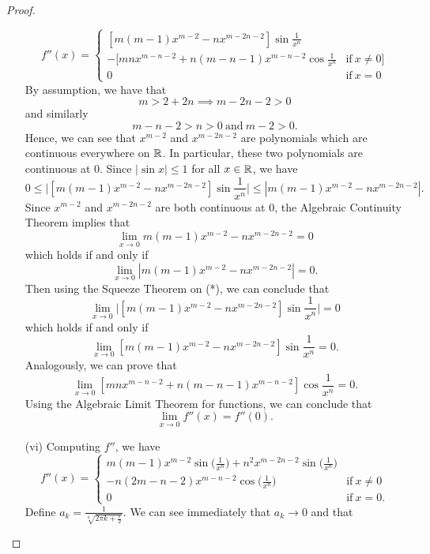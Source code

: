 \documentclass[a4paper]{article}
\begin{document}
\begin{proof}
\begin{enumerate}
        \[  f''(x) = 
        \begin{cases}
            [m(m-1)x^{m-2} - n x^{m-2n-2}] \sin \frac{ 1 }{ x^{n} } \\
            -[mn x^{m-n-2} + n (m - n -1) x^{m-n-2} \cos \frac{ 1 }{ x^{n} } &\text{if} \ x \neq 0 ] \\
            0 &\text{if} \ x = 0 
        \end{cases} \]
        By assumption, we have that 
        \[  m > 2 + 2n \implies m - 2n - 2 > 0 \]
        and similarly
        \[  m - n - 2 > n > 0 \ \text{and} \ m - 2 > 0.  \]
        Hence, we can see that \( x^{m-2} \) and \( x^{m-2n-2}  \) are polynomials which are continuous everywhere on \( \mathbb{R}  \). In particular, these two polynomials are continuous at \( 0  \). Since \( | \sin x  | \leq 1  \) for all \( x \in \mathbb{R}  \), we have
        \[  0 \leq \Big| [m(m-1) x^{m-2} - n x^{m-2n-2}] \sin \frac{ 1 }{ x^{n} }  \Big| \leq | m(m-1) x^{m-2} - n x^{m-2n-2} |. \tag{*}    \]
        Since \( x^{m-2} \) and \( x^{m-2n-2}  \) are both continuous at \( 0  \), the Algebraic Continuity Theorem implies that 
        \[  \lim_{ x \to 0 }  m(m-1) x^{m-2} - n x^{m-2n-2} = 0  \]
        which holds if and only if 
        \[ \lim_{ x \to 0 } | m(m-1) x^{m-2} - n x^{m-2n-2} | = 0.    \]
        Then using the Squeeze Theorem on (*), we can conclude that 
        \[  \lim_{ x \to 0 } \Big| [m(m-1)x^{m-2} - n x^{m-2n-2}] \sin \frac{ 1 }{ x^{n} }  \Big| = 0   \]
        which holds if and only if
        \[ \lim_{ x \to 0 } [m(m-1) x^{m-2} - n x^{m-2n-2}] \sin \frac{ 1 }{ x^{n} } = 0. \tag{1}  \]
        Analogously, we can prove that  
        \[  \lim_{ x \to 0 }  [mn x^{m-n-2} + n (m-n-1) x^{m-n-2}] \cos \frac{ 1 }{ x^{n} }  = 0. \tag{2}  \]
        Using the Algebraic Limit Theorem for functions, we can conclude that 
        \[  \lim_{ x \to 0 }  f''(x) =  f''(0).  \] 
    \item[(vi)] Computing \( f'' \), we have 
        \[  f''(x) = 
        \begin{cases}
            m(m-1)x^{m-2} \sin \Big(  \frac{ 1 }{ x^{n} }  \Big)  + n^{2} x^{m-2n-2} \sin \Big(  \frac{ 1 }{ x^{n} } \Big) \\ - n (2m - n - 2) x^{m-n-2} \cos \Big(  \frac{ 1 }{ x^{n} }  \Big)  &\text{if} \ x \neq 0  \\
            0 &\text{if} \ x = 0.
        \end{cases} \]
        Define \( {a}_{k} = \frac{ 1 }{ \sqrt[n]{ 2 \pi k  + \frac{ \pi }{ 2 }  }  }  \). We can see immediately that \( {a}_{k } \to 0  \) and that  

\end{enumerate}
\end{proof}
\end{document}
